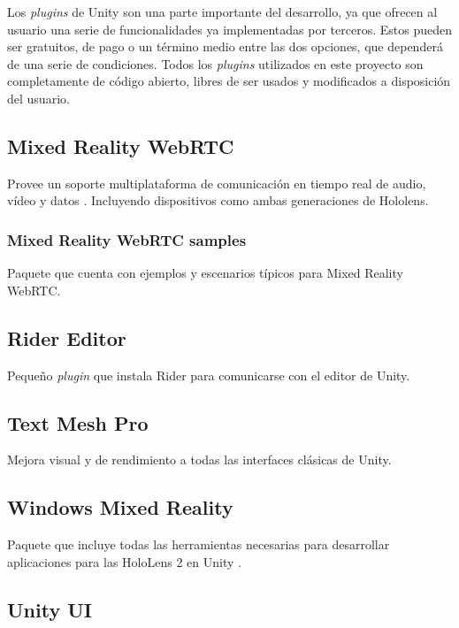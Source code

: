 Los \textit{plugins} de Unity son una parte importante del desarrollo, ya que ofrecen al usuario una serie de funcionalidades ya implementadas por terceros. Estos pueden ser gratuitos, de pago o un término medio entre las dos opciones, que dependerá de una serie de condiciones. Todos los \textit{plugins} utilizados en este proyecto son completamente de código abierto, libres de ser usados y modificados a disposición del usuario.

\subsection{Mixed Reality WebRTC}

Provee un soporte multiplataforma de comunicación en tiempo real de audio, vídeo y datos \cite{git:webrtc}. Incluyendo dispositivos como ambas generaciones de Hololens.

\subsubsection{Mixed Reality WebRTC samples}

Paquete que cuenta con ejemplos y escenarios típicos para Mixed Reality WebRTC.

\subsection{Rider Editor}

Pequeño \textit{plugin} que instala Rider para comunicarse con el editor de Unity.

\subsection{Text Mesh Pro}

Mejora visual y de rendimiento a todas las interfaces clásicas de Unity.

\subsection{Windows Mixed Reality}

Paquete que incluye todas las herramientas necesarias para desarrollar aplicaciones para las HoloLens 2 en Unity \cite{unity:windowsmixedreality}.

\subsection{Unity UI}


